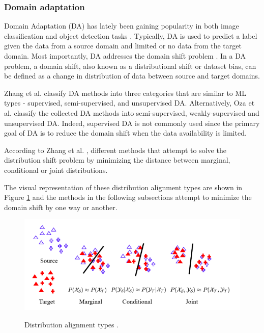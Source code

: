 

\subsubsection{Domain adaptation}
\label{DA_section} 
Domain Adaptation (DA) has lately been gaining popularity in both image classification and object detection tasks \cite{Zhang2021}. Typically, DA is used to predict a label given the data from a source domain and limited or no data from the target domain. Most importantly, DA addresses the domain shift problem \cite{Zhang2021}. In a DA problem, a domain shift, also known as a distributional shift or dataset bias, can be defined as a change in distribution of data between source and target domains. 


Zhang et al. \cite{Zhang2021} classify DA methods into three categories that are similar to ML types - supervised, semi-supervised, and unsupervised DA. Alternatively, Oza et al. \cite{Oza2021} classify the collected DA methods into semi-supervised, weakly-supervised and unsupervised DA. Indeed, supervised DA is not commonly used since the primary goal of DA is to reduce the domain shift when the data availability is limited. 

According to Zhang et al. \cite{Zhang2021}, different methods that attempt to solve the distribution shift problem by minimizing the distance between marginal, conditional or joint distributions. 

The visual representation of these distribution alignment types are shown in Figure \ref{distribution} and the methods in the following subsections attempt to minimize the domain shift by one way or another. 

\begin{figure}[htb]
	\begin{center}
		\includegraphics[width=12cm]{./distribution.png}
	\end{center}
	\caption{Distribution alignment types \cite{Zhang2021}.}
	\begin{center}
		\label{distribution}
	\end{center}
\end{figure}
\FloatBarrier 



